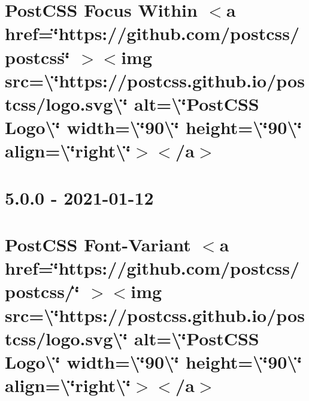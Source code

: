 \documentclass[twoside]{book}
\newcommand{\+}{\discretionary{\mbox{\scriptsize$\hookleftarrow$}}{}{}}
\begin{document}
\chapter{Post\+CSS Focus Within \texorpdfstring{$<$}{<}a href=\char`\"{}https\+://github.\+com/postcss/postcss\char`\"{} \texorpdfstring{$>$}{>}\texorpdfstring{$<$}{<}img src=\textbackslash{}\char`\"{}https\+://postcss.\+github.\+io/postcss/logo.\+svg\textbackslash{}\char`\"{} alt=\textbackslash{}\char`\"{}\+Post\+CSS Logo\textbackslash{}\char`\"{} width=\textbackslash{}\char`\"{}90\textbackslash{}\char`\"{} height=\textbackslash{}\char`\"{}90\textbackslash{}\char`\"{} align=\textbackslash{}\char`\"{}right\textbackslash{}\char`\"{}\texorpdfstring{$>$}{>}\texorpdfstring{$<$}{<}/a\texorpdfstring{$>$}{>}}
\label{md__c___users_vaishnavi_jadhav__desktop__developer_code_mean_stack_example_client_node_modules_p8cb21324d6a6ca356886a078ec16795f}

\chapter{5.0.0 -\/ 2021-\/01-\/12}
\label{md__c___users_vaishnavi_jadhav__desktop__developer_code_mean_stack_example_client_node_modules_pb144a6b6b4f5e9ad61f60062309adb4d}

\chapter{Post\+CSS Font-\/\+Variant \texorpdfstring{$<$}{<}a href=\char`\"{}https\+://github.\+com/postcss/postcss/\char`\"{} \texorpdfstring{$>$}{>}\texorpdfstring{$<$}{<}img src=\textbackslash{}\char`\"{}https\+://postcss.\+github.\+io/postcss/logo.\+svg\textbackslash{}\char`\"{} alt=\textbackslash{}\char`\"{}\+Post\+CSS Logo\textbackslash{}\char`\"{} width=\textbackslash{}\char`\"{}90\textbackslash{}\char`\"{} height=\textbackslash{}\char`\"{}90\textbackslash{}\char`\"{} align=\textbackslash{}\char`\"{}right\textbackslash{}\char`\"{}\texorpdfstring{$>$}{>}\texorpdfstring{$<$}{<}/a\texorpdfstring{$>$}{>}}
\label{md__c___users_vaishnavi_jadhav__desktop__developer_code_mean_stack_example_client_node_modules_p1da6ca69c013ffe318c303dcaa4f4378}

\end{document}
